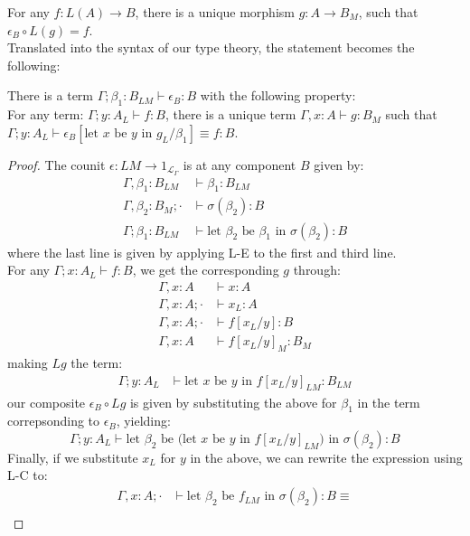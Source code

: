 For any $f : L(A) \to B$, there is a unique morphism $g : A \to B_M$, such that $\epsilon_B \circ L(g) = f$.\\
Translated into the syntax of our type theory, the statement becomes the following:\\
\begin{thm}[$L \dashv M$]
There is a term $\Gamma; \beta_1 : B_{LM} \vdash \epsilon_B: B$ with the following property:\\
For any term: $\Gamma; y : A_L \vdash f : B$, there is a unique term $\Gamma, x : A \vdash g : B_{M}$ such that $\Gamma; y : A_L \vdash \epsilon_B[\text{let $x$ be $y$ in }g_L/\beta_1] \equiv f : B$.\\
\begin{proof}
 The counit $\epsilon : LM \to 1_{\mathcal{L}_{\Gamma}}$ is at any component $B$ given by:
 \[
  \begin{split}
    \Gamma, \beta_1 : B_{LM} &\vdash \beta_1 : B_{LM}\\
    \Gamma, \beta_2 : B_{M}; \cdot &\vdash \sigma(\beta_2) : B\\
    \Gamma; \beta_1 : B_{LM} &\vdash \text{let $\beta_2$ be $\beta_1$ in }\sigma(\beta_2) : B 
  \end{split}
\]
  where the last line is given by applying L-E to the first and third line.\\
  For any $\Gamma; x : A_L \vdash f : B$, we get the corresponding $g$ through:
  \[
    \begin{split}
      \Gamma, x : A &\vdash x : A\\
      \Gamma, x : A; \cdot &\vdash x_L : A\\
      \Gamma, x : A; \cdot &\vdash f[x_L/y] : B\\
      \Gamma, x : A &\vdash f[x_L/y]_M : B_M
      \end{split}
    \]
    making $Lg$ the term:
\[
  \begin{split}
    \Gamma; y : A_L &\vdash \text{let $x$ be $y$ in } f[x_L/y]_{LM} : B_{LM}
  \end{split}
\]
our composite $\epsilon_B \circ Lg$ is given by substituting the above for $\beta_1$ in the term correpsonding to $\epsilon_B$, yielding:
\[
  \Gamma; y : A_L \vdash \text{let $\beta_2$ be (let $x$ be $y$ in $f[x_L/y]_{LM}$) in }\sigma(\beta_2) : B
\]
Finally, if we substitute $x_L$ for $y$ in the above, we can rewrite the expression using L-C to:
\[
  \begin{split}
    \Gamma, x : A; \cdot &\vdash \text{let $\beta_2$ be $f_{LM}$ in }\sigma(\beta_2) : B \equiv \\

\end{split}\]
\end{proof}
\end{thm}
